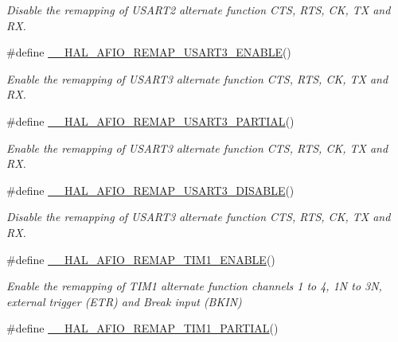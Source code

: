 \begin{DoxyCompactItemize}
\begin{DoxyCompactList}\small\item\em Disable the remapping of U\+S\+A\+R\+T2 alternate function C\+TS, R\+TS, CK, TX and RX. \end{DoxyCompactList}\item 
\#define \hyperlink{group___g_p_i_o_ex___a_f_i_o___a_f___r_e_m_a_p_p_i_n_g_gaed50d157afc9236c3f6cab368e6fa29b}{\+\_\+\+\_\+\+H\+A\+L\+\_\+\+A\+F\+I\+O\+\_\+\+R\+E\+M\+A\+P\+\_\+\+U\+S\+A\+R\+T3\+\_\+\+E\+N\+A\+B\+LE}()
\begin{DoxyCompactList}\small\item\em Enable the remapping of U\+S\+A\+R\+T3 alternate function C\+TS, R\+TS, CK, TX and RX. \end{DoxyCompactList}\item 
\#define \hyperlink{group___g_p_i_o_ex___a_f_i_o___a_f___r_e_m_a_p_p_i_n_g_ga176ae8487c80d60664759a295961de31}{\+\_\+\+\_\+\+H\+A\+L\+\_\+\+A\+F\+I\+O\+\_\+\+R\+E\+M\+A\+P\+\_\+\+U\+S\+A\+R\+T3\+\_\+\+P\+A\+R\+T\+I\+AL}()
\begin{DoxyCompactList}\small\item\em Enable the remapping of U\+S\+A\+R\+T3 alternate function C\+TS, R\+TS, CK, TX and RX. \end{DoxyCompactList}\item 
\#define \hyperlink{group___g_p_i_o_ex___a_f_i_o___a_f___r_e_m_a_p_p_i_n_g_ga4c86c7456cb7eda460d258245bb2e446}{\+\_\+\+\_\+\+H\+A\+L\+\_\+\+A\+F\+I\+O\+\_\+\+R\+E\+M\+A\+P\+\_\+\+U\+S\+A\+R\+T3\+\_\+\+D\+I\+S\+A\+B\+LE}()
\begin{DoxyCompactList}\small\item\em Disable the remapping of U\+S\+A\+R\+T3 alternate function C\+TS, R\+TS, CK, TX and RX. \end{DoxyCompactList}\item 
\#define \hyperlink{group___g_p_i_o_ex___a_f_i_o___a_f___r_e_m_a_p_p_i_n_g_gaef7a1246d22973634c293094a2418200}{\+\_\+\+\_\+\+H\+A\+L\+\_\+\+A\+F\+I\+O\+\_\+\+R\+E\+M\+A\+P\+\_\+\+T\+I\+M1\+\_\+\+E\+N\+A\+B\+LE}()
\begin{DoxyCompactList}\small\item\em Enable the remapping of T\+I\+M1 alternate function channels 1 to 4, 1N to 3N, external trigger (E\+TR) and Break input (B\+K\+IN) \end{DoxyCompactList}\item 
\#define \hyperlink{group___g_p_i_o_ex___a_f_i_o___a_f___r_e_m_a_p_p_i_n_g_ga4e4fec9496a03c10c94f0f4e8d940b08}{\+\_\+\+\_\+\+H\+A\+L\+\_\+\+A\+F\+I\+O\+\_\+\+R\+E\+M\+A\+P\+\_\+\+T\+I\+M1\+\_\+\+P\+A\+R\+T\+I\+AL}()

\end{DoxyCompactItemize}
